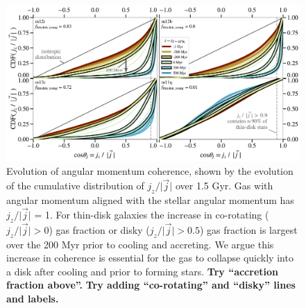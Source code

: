 \documentclass[fleqn,usenatbib]{mnras}
\begin{document}
\begin{figure}
    \centering
    \includegraphics[width=\textwidth]{figures/jzjmag_vs_t.pdf}
    \caption{
    Evolution of angular momentum coherence, shown by the evolution of the cumulative distribution of $j_z / \vert \vec j \vert$ over 1.5 Gyr.
    Gas with angular momentum aligned with the stellar angular momentum has $j_z / \vert \vec j \vert$ = 1.
    For thin-disk galaxies the increase in co-rotating ($j_z/\vert \vec j \vert > 0$) gas fraction or disky ($j_z/\vert \vec j \vert > 0.5$) gas fraction is largest over the 200 Myr prior to cooling and accreting.
    We argue this increase in coherence is essential for the gas to collapse quickly into a disk after cooling and prior to forming stars.
    \textbf{Try ``accretion fraction above''.}
    \textbf{Try adding ``co-rotating'' and ``disky'' lines and labels.}
    }
    \label{f: coherence}
\end{figure}
\end{document}
